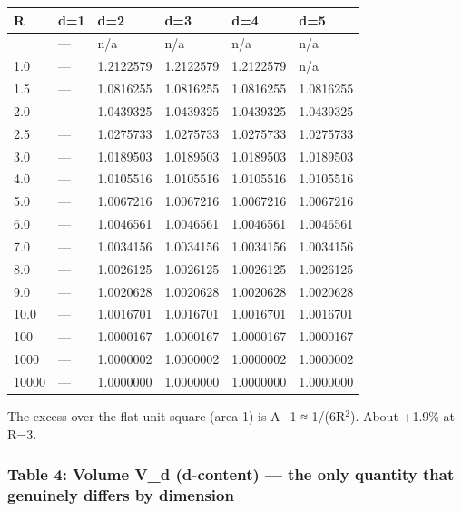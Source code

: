\documentclass[
]{ltjsarticle}
\newcounter{none} %
\begin{document}
{\def\LTcaptype{none} %
\begin{longtable}[]{@{}llllll@{}}
\toprule\noalign{}
R & d=1 & d=2 & d=3 & d=4 & d=5 \\
\midrule\noalign{}
\endhead
\bottomrule\noalign{}
\endlastfoot
0.5 & --- & n/a & n/a & n/a & n/a \\
1.0 & --- & 1.2122579 & 1.2122579 & 1.2122579 & n/a \\
1.5 & --- & 1.0816255 & 1.0816255 & 1.0816255 & 1.0816255 \\
2.0 & --- & 1.0439325 & 1.0439325 & 1.0439325 & 1.0439325 \\
2.5 & --- & 1.0275733 & 1.0275733 & 1.0275733 & 1.0275733 \\
3.0 & --- & 1.0189503 & 1.0189503 & 1.0189503 & 1.0189503 \\
4.0 & --- & 1.0105516 & 1.0105516 & 1.0105516 & 1.0105516 \\
5.0 & --- & 1.0067216 & 1.0067216 & 1.0067216 & 1.0067216 \\
6.0 & --- & 1.0046561 & 1.0046561 & 1.0046561 & 1.0046561 \\
7.0 & --- & 1.0034156 & 1.0034156 & 1.0034156 & 1.0034156 \\
8.0 & --- & 1.0026125 & 1.0026125 & 1.0026125 & 1.0026125 \\
9.0 & --- & 1.0020628 & 1.0020628 & 1.0020628 & 1.0020628 \\
10.0 & --- & 1.0016701 & 1.0016701 & 1.0016701 & 1.0016701 \\
100 & --- & 1.0000167 & 1.0000167 & 1.0000167 & 1.0000167 \\
1000 & --- & 1.0000002 & 1.0000002 & 1.0000002 & 1.0000002 \\
10000 & --- & 1.0000000 & 1.0000000 & 1.0000000 & 1.0000000 \\
\end{longtable}
}

The excess over the flat unit square (area 1) is A−1 ≈ 1/(6R\(^{2}\)).
About +1.9\% at R=3.

\subsubsection{Table 4: Volume V\_d (d-content) --- the only quantity
that genuinely differs by
dimension}\label{table-4-volume-v_d-d-content-the-only-quantity-that-genuinely-differs-by-dimension}
\end{document}
